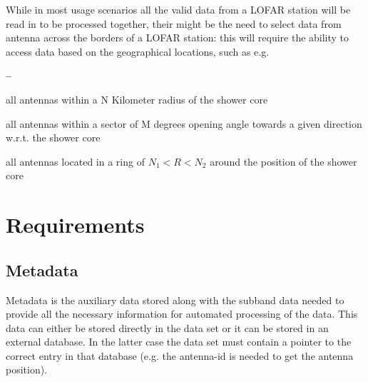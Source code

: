 \documentclass[a4paper,10pt,bibtotoc]{scrartcl}
\begin{document}
While in most usage scenarios all the valid data from a LOFAR station will
be read in to be processed together, their might be the need to select data
from antenna across the borders of a LOFAR station: this will require the
ability to access data based on the geographical locations, such as e.g.
\begin{list}{\textbf{--}}{} \parskip 0pt
\item all antennas within a N Kilometer radius of the shower core
\item all antennas within a sector of M degrees opening angle towards a given
  direction w.r.t. the shower core
\item all antennas located in a ring of $N_1 < R < N_2$ around the position
  of the shower core
\end{list}


\section{Requirements}
\label{sec:requirements}

\subsection{Metadata}
\label{sec:metadata}

Metadata is the auxiliary data stored along with the subband data needed to
provide all the necessary information for automated processing of the data.
This data can either be stored directly in the data set or it can be stored
in an external database. In the latter case the data set must contain a
pointer to the correct entry in that database (e.g. the antenna-id is needed
to get the antenna position).
\end{document}
